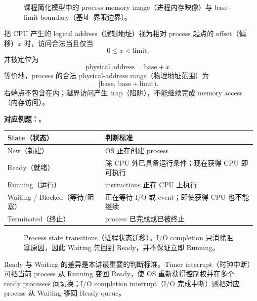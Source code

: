 \begin{figure}[htbp]
  \centering
  \resizebox{0.82\textwidth}{!}{}
  \caption{课程简化模型中的 process memory image（进程内存映像）与 base--limit boundary（基址--界限边界）。}
  \label{fig:sc2005-l03-address-space}
\end{figure}

把 CPU 产生的 logical address（逻辑地址）视为相对 process 起点的 offset（偏移）$x$ 时，访问合法当且仅当
\[
  0\leq x<\text{limit},
\]
并被定位为
\[
  \text{physical address}=\text{base}+x.
\]
等价地，process 的合法 physical-address range（物理地址范围）为
\[
  [\text{base},\,\text{base}+\text{limit}).
\]
右端点不包含在内；越界访问产生 trap（陷阱），不能继续完成 memory access（内存访问）。

\textbf{对应例题：}。


\begin{center}
\small
\begin{tabularx}{0.94\textwidth}{@{}>{\raggedright\arraybackslash}p{2.8cm}X@{}}
  \toprule
  State（状态） & 判断标准 \\
  \midrule
  New（新建） & OS 正在创建 process \\
  Ready（就绪） & 除 CPU 外已具备运行条件；现在获得 CPU 即可执行 \\
  Running（运行） & instructions 正在 CPU 上执行 \\
  Waiting / Blocked（等待/阻塞） & 正在等待 I/O 或 event；即使获得 CPU 也不能继续 \\
  Terminated（终止） & process 已完成或已被终止 \\
  \bottomrule
\end{tabularx}
\end{center}

\begin{figure}[htbp]
  \centering
  \resizebox{0.98\textwidth}{!}{}
  \caption{Process state transitions（进程状态迁移）。I/O completion 只消除阻塞原因，因此 Waiting 先回到 Ready，并不保证立即 Running。}
  \label{fig:sc2005-l03-state-transitions}
\end{figure}

Ready 与 Waiting 的差异是本讲最重要的判断标准。Timer interrupt（时钟中断）可把当前 process 从 Running 变回 Ready，使 OS 重新获得控制权并在多个 ready processes 间切换；I/O completion interrupt（I/O 完成中断）则把对应 process 从 Waiting 移回 Ready queue。

